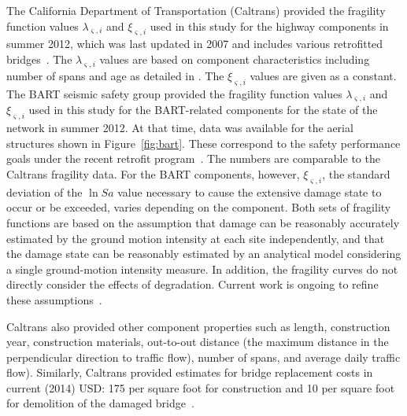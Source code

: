 The California Department of Transportation (Caltrans) provided the fragility function values $\lambda_{\varsigma,i}$ and $\xi_{\varsigma,i}$ used in this study for the highway components in summer 2012, which was last updated in 2007 and includes various retrofitted bridges~\cite{caltrans_caltrans_2013}. The $\lambda_{\varsigma,i}$ values are based on component characteristics including number of spans and age as detailed in \cite{basoz_enhancement_1999}. The $\xi_{\varsigma,i}$ values are given as a constant. The BART seismic safety group provided the  fragility function values $\lambda_{\varsigma,i}$ and $\xi_{\varsigma,i}$ used in this study for the BART-related components for the state of the network in summer 2012. At that time, data was available for the aerial structures shown in Figure~\ref{fig:bart}. These correspond to the safety performance goals under the recent retrofit program~\cite{bechtel/hntb_team_design_2008}. The numbers are comparable to the Caltrans fragility data. For the BART components, however, $\xi_{\varsigma,i}$, the standard deviation of the $\ln Sa$ value necessary to cause the extensive damage state to occur or be exceeded, varies depending on the component. Both sets of fragility functions are based on the assumption that damage can be reasonably accurately estimated by the ground motion intensity at each site independently, and that the damage state can be reasonably estimated by an analytical model considering a single ground-motion intensity measure.  In addition, the fragility curves do not directly consider the effects of degradation. Current work is ongoing to refine these assumptions~\cite[e.g.,][]{ramanathan_next_2012,kurtz_time-varying_2014,ghosh_seismic_2013}.


Caltrans also provided other component properties such as length, construction year, construction materials, out-to-out distance (the maximum distance in the perpendicular direction to traffic flow), number of spans, and average daily traffic flow). Similarly, Caltrans provided estimates for bridge replacement costs in current (2014) USD: 175  per square foot for construction and 10  per square foot for demolition of the damaged bridge~\cite{pugh_construction_2012}. 


